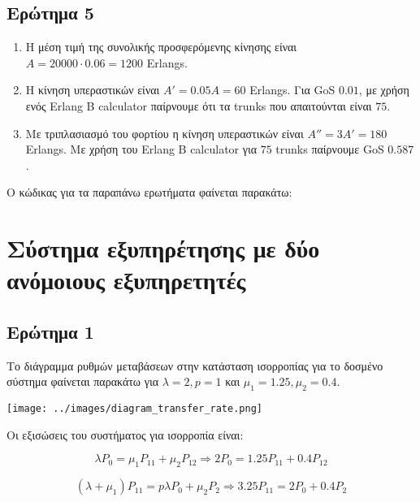 \documentclass[12pt]{article}
\begin{document}
\subsection{Ερώτημα 5}
\begin{enumerate}
    \item{}
        Η μέση τιμή της συνολικής προσφερόμενης κίνησης είναι $A = 20000 \cdot 0.06 = 1200$ Erlangs.
    \item{}
        Η κίνηση υπεραστικών είναι $Α' = 0.05Α = 60$ Erlangs. Για GoS $0.01$, με χρήση ενός 
        Erlang B calculator παίρνουμε ότι τα trunks που απαιτούνται είναι $75$.

    \item{}
        Με τριπλασιασμό του φορτίου η κίνηση υπεραστικών είναι $Α'' = 3Α' = 180$ Erlangs.
        Με χρήση του Erlang B calculator για $75$ trunks παίρνουμε GoS $0.587$.
\end{enumerate}

Ο κώδικας για τα παραπάνω ερωτήματα φαίνεται παρακάτω:


\pagebreak

\section{Σύστημα εξυπηρέτησης με δύο ανόμοιους εξυπηρετητές}

\subsection{Ερώτημα 1}

Το διάγραμμα ρυθμών μεταβάσεων στην κατάσταση ισορροπίας για το δοσμένο σύστημα 
φαίνεται παρακάτω για $\lambda = 2, p = 1$ και $\mu_1 = 1.25, \mu_2 = 0.4$.

\begin{center}
    \texttt{[image: ../images/diagram\_transfer\_rate.png]}
\end{center}

Οι εξισώσεις του συστήματος για ισορροπία είναι: 

\begin{equation}
    \lambda P_0 = \mu_1 P_{11} + \mu_2 P_{12} \Rightarrow 2P_0 = 1.25P_{11} + 0.4P_{12} 
\end{equation}

\begin{equation}
    (\lambda + \mu_1) P_{11}  = p \lambda P_0 + \mu_2 P_2 \Rightarrow 3.25 P_{11} = 2P_0 + 0.4P_2
\end{equation}
\end{document}
